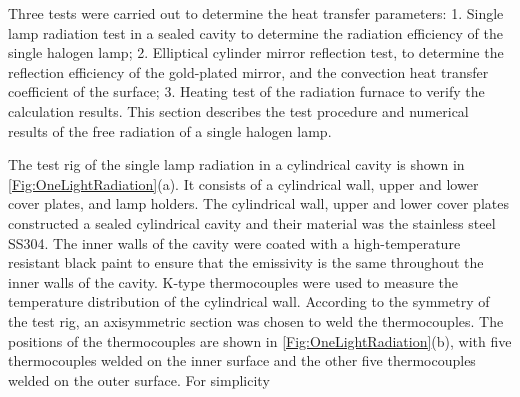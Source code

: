 Three tests were carried out to determine the heat transfer parameters:
1. Single lamp radiation test in a sealed cavity to determine the radiation efficiency of the single halogen lamp;
2. Elliptical cylinder mirror reflection test, to determine the reflection efficiency of the gold-plated mirror, and the convection heat transfer coefficient of the surface;
3. Heating test of the radiation furnace to verify the calculation results.
This section describes the test procedure and numerical results of the free radiation of a single halogen lamp.


The test rig of the single lamp radiation in a cylindrical cavity is shown in \ref{Fig:OneLightRadiation}(a).
It consists of a cylindrical wall, upper and lower cover plates, and lamp holders.
The cylindrical wall, upper and lower cover plates constructed a sealed cylindrical cavity and their material was the stainless steel SS304. The inner walls of the cavity were coated with a high-temperature resistant black paint to ensure that the emissivity is the same throughout the inner walls of the cavity.
K-type thermocouples were used to measure the temperature distribution of the cylindrical wall.
According to the symmetry of the test rig, an axisymmetric section was chosen to weld the thermocouples. The positions of the thermocouples are shown in \ref{Fig:OneLightRadiation}(b), with five thermocouples welded on the inner surface and the other five thermocouples welded on the outer surface. For simplicity

